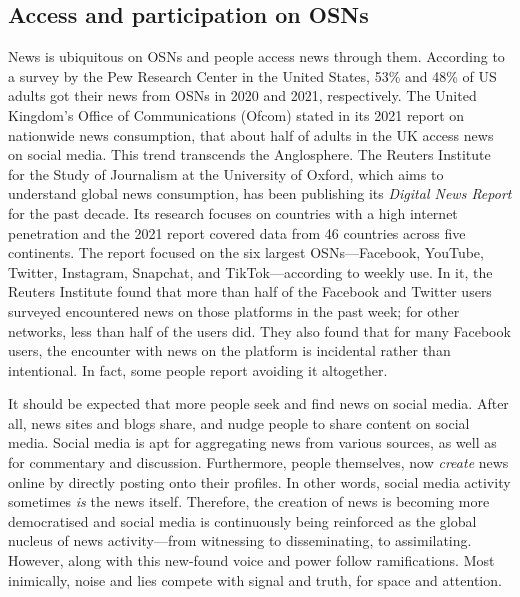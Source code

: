\subsection{Access and participation on OSNs}
\label{ssec:1-access}

News is ubiquitous on \acp{OSN} and people access news through them. According to a survey by the Pew Research Center in the United States, 53\% and 48\% of US adults got their news from \acp{OSN} in 2020 and 2021, respectively. The United Kingdom's Office of Communications (Ofcom) stated in its 2021 report on nationwide news consumption, that about half of adults in the UK access news on social media. This trend transcends the Anglosphere. The Reuters Institute for the Study of Journalism at the University of Oxford, which aims to understand global news consumption, has been publishing its \emph{Digital News Report} for the past decade. Its research focuses on countries with a high internet penetration and the 2021 report covered data from 46 countries across five continents. The report focused on the six largest \acp{OSN}—Facebook, YouTube, Twitter, Instagram, Snapchat, and TikTok—according to weekly use. In it, the Reuters Institute found that more than half of the Facebook and Twitter users surveyed encountered news on those platforms in the past week; for other networks, less than half of the users did. They also found that for many Facebook users, the encounter with news on the platform is incidental rather than intentional. In fact, some people report avoiding it altogether.

It should be expected that more people seek and find news on social media. After all, news sites and blogs share, and nudge people to share content on social media. Social media is apt for aggregating news from various sources, as well as for commentary and discussion. Furthermore, people themselves, now \emph{create} news online by directly posting onto their profiles. In other words, social media activity sometimes \emph{is} the news itself. Therefore, the creation of news is becoming more democratised and social media is continuously being reinforced as the global nucleus of news activity—from witnessing to disseminating, to assimilating. However, along with this new-found voice and power follow ramifications. Most inimically, noise and lies compete with signal and truth, for space and attention.

